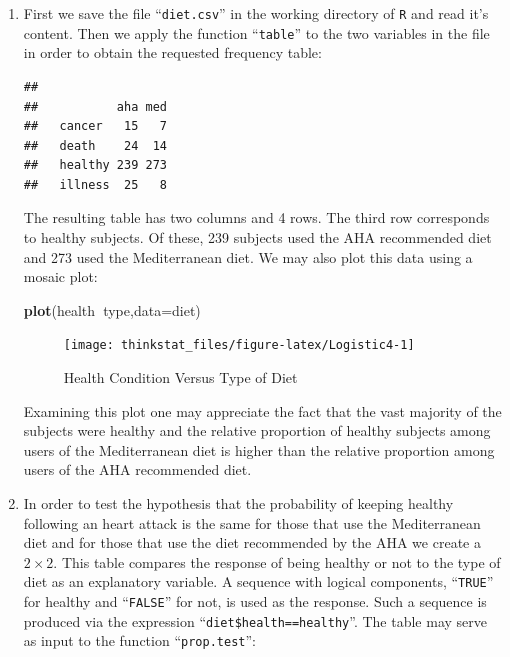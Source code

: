 \documentclass[]{krantz}
\makeatletter
\newenvironment{Shaded}{\begin{snugshade}}{\end{snugshade}}
\newcommand{\KeywordTok}[1]{\textcolor[rgb]{0.13,0.29,0.53}{\textbf{#1}}}
\newcommand{\DataTypeTok}[1]{\textcolor[rgb]{0.13,0.29,0.53}{#1}}
\newcommand{\StringTok}[1]{\textcolor[rgb]{0.31,0.60,0.02}{#1}}
\newcommand{\OperatorTok}[1]{\textcolor[rgb]{0.81,0.36,0.00}{\textbf{#1}}}
\newcommand{\NormalTok}[1]{#1}
\newenvironment{kframe}{%
\medskip{}
\setlength{\fboxsep}{.8em}
 \def\at@end@of@kframe{}%
 \ifinner\ifhmode%
  \def\at@end@of@kframe{\end{minipage}}%
  \begin{minipage}{\columnwidth}%
 \fi\fi%
 \def\FrameCommand##1{\hskip\@totalleftmargin \hskip-\fboxsep
 \colorbox{shadecolor}{##1}\hskip-\fboxsep
     \hskip-\linewidth \hskip-\@totalleftmargin \hskip\columnwidth}%
 \MakeFramed {\advance\hsize-\width
   \@totalleftmargin\z@ \linewidth\hsize
   \@setminipage}}%
 {\par\unskip\endMakeFramed%
 \at@end@of@kframe}
\renewenvironment{Shaded}{\begin{kframe}}{\end{kframe}}
\theoremstyle{definition}
\theoremstyle{definition}
\theoremstyle{definition}
\theoremstyle{remark}
\makeatother
\begin{document}
\begin{enumerate}
\def\labelenumi{\arabic{enumi}.}
\item
  First we save the file ``\texttt{diet.csv}'' in the working directory
  of \texttt{R} and read it's content. Then we apply the function
  ``\texttt{table}'' to the two variables in the file in order to obtain
  the requested frequency table:

\begin{Shaded}
\end{Shaded}

\begin{verbatim}
##          
##           aha med
##   cancer   15   7
##   death    24  14
##   healthy 239 273
##   illness  25   8
\end{verbatim}

  The resulting table has two columns and 4 rows. The third row
  corresponds to healthy subjects. Of these, 239 subjects used the AHA
  recommended diet and 273 used the Mediterranean diet. We may also plot
  this data using a mosaic plot:

\begin{Shaded}
\begin{Highlighting}[]
\KeywordTok{plot}\NormalTok{(health}\OperatorTok{~}\NormalTok{type,}\DataTypeTok{data=}\NormalTok{diet)}
\end{Highlighting}
\end{Shaded}

  \begin{figure}

  {\centering \texttt{[image: thinkstat\_files/figure-latex/Logistic4-1]} 

  }

  \caption{Health Condition Versus Type of Diet}\label{fig:Logistic4}
  \end{figure}

  Examining this plot one may appreciate the fact that the vast majority
  of the subjects were healthy and the relative proportion of healthy
  subjects among users of the Mediterranean diet is higher than the
  relative proportion among users of the AHA recommended diet.
\item
  In order to test the hypothesis that the probability of keeping
  healthy following an heart attack is the same for those that use the
  Mediterranean diet and for those that use the diet recommended by the
  AHA we create a \(2\times 2\). This table compares the response of
  being healthy or not to the type of diet as an explanatory variable. A
  sequence with logical components, ``\texttt{TRUE}'' for healthy and
  ``\texttt{FALSE}'' for not, is used as the response. Such a sequence
  is produced via the expression ``\texttt{diet\$health==healthy}''. The
  table may serve as input to the function ``\texttt{prop.test}'':


\end{enumerate}
\end{document}
